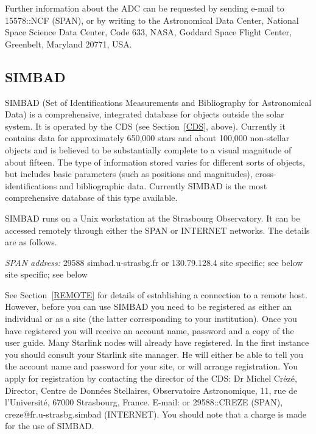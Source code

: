 Further information about the ADC can be requested by sending e-mail
to 15578::NCF (SPAN), or by writing to the Astronomical Data Center, 
National Space Science Data Center, Code 633, NASA, Goddard Space Flight
Center, Greenbelt, Maryland 20771, USA.

\subsection{SIMBAD}

SIMBAD (Set of Identifications Measurements and Bibliography for 
Astronomical Data) is a comprehensive, integrated database for objects
outside the solar system. It is operated by the CDS (see 
Section~\ref{CDS}, above). Currently it contains data for 
approximately 650,000 stars and about 100,000 non-stellar objects and
is believed to be substantially complete to a visual magnitude of about 
fifteen. The type of information stored varies for different sorts of 
objects, but includes basic parameters (such as positions and 
magnitudes), cross-identifications and bibliographic data. Currently
SIMBAD is the most comprehensive database of this type available.

SIMBAD runs on a Unix workstation at the Strasbourg Observatory. It
can be accessed remotely through either the SPAN or INTERNET networks.
The details are as follows.

{\it SPAN address: } 29588
 simbad.u-strasbg.fr or 130.79.128.4
 site specific; see below
 site specific; see below

See Section~\ref{REMOTE} for details of establishing a connection to
a remote host. However, before you can use SIMBAD you need to be 
registered as either an individual or as a site (the latter 
corresponding to your institution). Once you have registered you will 
receive an account name, password and a copy of the user guide. Many 
Starlink nodes will already have registered. In the first instance you 
should consult your Starlink site manager. He will either be able to 
tell you the account name and password for your site, or will arrange 
registration. You apply for registration by contacting the director of 
the CDS: Dr Michel Cr\'{e}z\'{e}, Director, Centre de Donn\'{e}es 
Stellaires, Observatoire Astronomique, 11, rue de l'Universit\'{e}, 
67000 Strasbourg, France. E-mail: or 29588::CREZE (SPAN), 
creze@fr.u-strasbg.simbad (INTERNET). You should note that a charge is
made for the use of SIMBAD.

